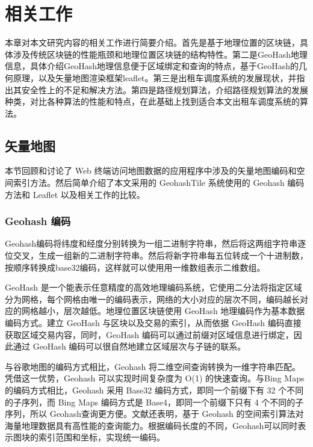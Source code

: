 \chapter{相关工作}
本章对本文研究内容的相关工作进行简要介绍。首先是基于地理位置的区块链，具体涉及传统区块链的性能瓶颈和地理位置区块链的结构特性。第二是GeoHash地理信息，具体介绍GeoHash地理信息便于区域绑定和查询的特点，基于GeoHash的几何原理，以及矢量地图渲染框架leaflet。第三是出租车调度系统的发展现状，并指出其安全性上的不足和解决方法。第四是路径规划算法，介绍路径规划算法的发展种类，对比各种算法的性能和特点，在此基础上找到适合本文出租车调度系统的算法。

\section{矢量地图}
本节回顾和讨论了 Web 终端访问地图数据的应用程序中涉及的矢量地图编码和空间索引方法。然后简单介绍了本文采用的 GeohashTile 系统使用的 Geohash 编码方法和 Leaflet 以及相关工作的比较。\par

\subsection{Geohash 编码}
Geohash编码将纬度和经度分别转换为一组二进制字符串，然后将这两组字符串逐位交叉，生成一组新的二进制字符串。然后将新字符串每五位转成一个十进制数，按顺序转换成base32编码，这样就可以使用用一维数组表示二维数组。\par
GeoHash 是一个能表示任意精度的高效地理编码系统，它使用二分法将指定区域分为网格，每个网格由唯一的编码表示，网络的大小对应的层次不同，编码越长对应的网格越小，层次越低。地理位置区块链使用 GeoHash 地理编码作为基本数据编码方式。建立 GeoHash 与区块以及交易的索引，从而依据 GeoHash 编码直接获取区域交易内容，同时，GeoHash 编码可以通过前缀对区域信息进行绑定，因此通过 GeoHash 编码可以很自然地建立区域层次与子链的联系。

与谷歌地图的编码方式相比，Geohash 将二维空间查询转换为一维字符串匹配。凭借这一优势，Geohash 可以实现时间复杂度为 O(1)  的快速查询。与Bing Maps的编码方式相比，Geohash 采用 Base32 编码方式，即同一个前缀下有 32 个不同的子序列，而 Bing Maps 编码方式是 Base4，即同一个前缀下只有 4 个不同的子序列，所以 Geohash查询更方便。文献还表明，基于 Geohash 的空间索引算法对海量地理数据具有高性能的查询能力。根据编码长度的不同，Geohash可以同时表示图块的索引范围和坐标，实现统一编码。

